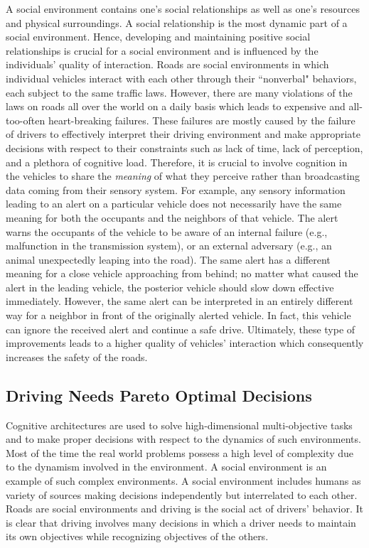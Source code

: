 \documentclass[journal, 11pt]{IEEEtran}
\begin{document}
A social environment contains one's social relationships as well as one's
resources and physical surroundings. A social relationship is the most dynamic
part of a social environment. Hence, developing and maintaining positive social
relationships is crucial for a social environment and is influenced by the
individuals' quality of interaction. Roads are social environments in which
individual vehicles interact with each other through their ``nonverbal"
behaviors, each subject to the same traffic laws. However, there are many
violations of the laws on roads all over the world on a daily basis which
leads to expensive and all-too-often heart-breaking failures. These failures are
mostly caused by the failure of drivers to effectively interpret their driving
environment and make appropriate decisions with respect to their constraints
such as lack of time, lack of perception, and a plethora of cognitive load.
Therefore, it is crucial to involve cognition in the vehicles to share the
\textit{meaning} of what they perceive rather than broadcasting data coming
from their sensory system. For example, any sensory information leading to an
alert on a particular vehicle does not necessarily have the same meaning for
both the occupants and the neighbors of that vehicle. The alert warns the
occupants of the vehicle to be aware of an internal failure (e.g., malfunction
in the transmission system), or an external adversary (e.g., an animal
unexpectedly leaping into the road). The same alert has a different meaning
for a close vehicle approaching from behind; no matter what caused the alert
in the leading vehicle, the posterior vehicle should slow down effective
immediately. However, the same alert can be interpreted in an entirely different
way for a neighbor in front of the originally alerted vehicle. In fact, this
vehicle can ignore the received alert and continue a safe drive. Ultimately,
these type of improvements leads to a higher quality of vehicles' interaction
which consequently increases the safety of the roads.

\subsection{Driving Needs Pareto Optimal Decisions}

Cognitive architectures are used to solve high-dimensional multi-objective
tasks and to make proper decisions with respect to the dynamics of such
environments. Most of the time the real world problems possess a high level of
complexity due to the dynamism involved in the environment. A social environment
is an example of such complex environments. A social environment includes humans
as variety of sources making decisions independently but interrelated to each
other. Roads are social environments and driving is the social act of drivers'
behavior. It is clear that driving involves many decisions in which a driver
needs to maintain its own objectives while recognizing objectives of the others.
\end{document}
